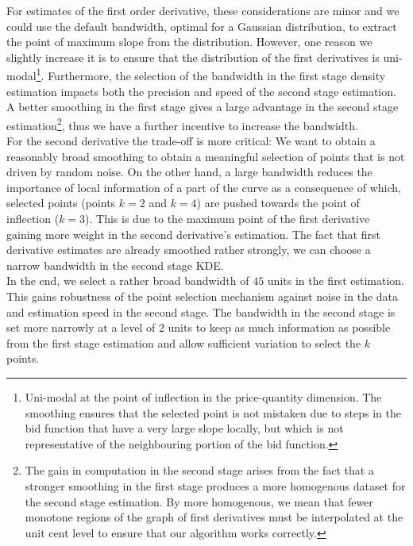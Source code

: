 \begin{subappendices}
For estimates of the first order derivative, these considerations are minor and we could use the default bandwidth, optimal for a Gaussian distribution, to extract the point of maximum slope from the distribution. However, one reason we  slightly increase it is to ensure that the distribution of the first derivatives is uni-modal\footnote{Uni-modal at the point of inflection in the price-quantity dimension. The smoothing ensures that the selected point is not mistaken due to steps in the bid function that have a very large slope locally, but which is not representative of the neighbouring portion of the bid function.}. Furthermore, the selection of the bandwidth in the first stage density estimation impacts both the precision and speed of the second stage estimation. A better smoothing in the first stage gives a large advantage in the second stage estimation\footnote{The gain in computation in the second stage arises from the fact that a stronger smoothing in the first stage produces a more homogenous dataset for the second stage estimation. By more homogenous, we mean that fewer monotone  regions of the graph of first derivatives must be interpolated at the unit cent level to ensure that our algorithm works correctly.}, thus we have a further incentive to increase the bandwidth. \\

For the second derivative the trade-off is more critical: We want to obtain a reasonably broad smoothing to obtain a meaningful selection of points that is not driven by random noise. On the other hand, a large bandwidth reduces the importance of local information of a part of the curve as a consequence of which, selected points (points $k=2$ and $k=4$) are pushed towards the point of inflection ($k=3$). This is due to the maximum point of the first derivative gaining more weight in the second derivative's estimation. The fact that first derivative estimates are already smoothed rather strongly, we can choose a narrow bandwidth in the second stage KDE. \\

In the end, we select a rather broad bandwidth  of $45$ units in the first estimation. This gains robustness of the point selection mechanism against noise in the data and estimation speed in the second stage. The bandwidth in the second stage is set  more narrowly at a level of $2$ units to keep as much information as possible from the first stage estimation and allow sufficient variation to select the $k$ points. \\


\end{subappendices}
